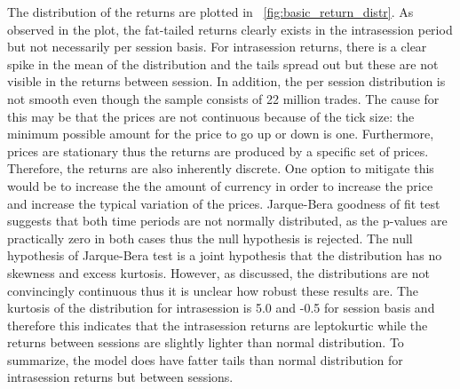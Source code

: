 The distribution of the returns are plotted in ~\ref{fig:basic_return_distr}. As observed in the plot, the fat-tailed returns
clearly exists in the intrasession period but not necessarily per session basis. For intrasession returns, there is a clear spike in the mean of the 
distribution and the tails spread out but these are not visible in the returns between session. In addition, the per session distribution
is not smooth even though the sample consists of 22 million trades. The cause for this may be that the prices are not 
continuous because of the tick size: the minimum possible amount for the price to go up or down is one. Furthermore, prices are
stationary thus the returns are produced by a specific set of prices. Therefore, the returns are also inherently discrete. One option
to mitigate this would be to increase the the amount of currency in order to increase the price and increase the typical
variation of the prices. Jarque-Bera goodness of fit test suggests that both time periods are not normally distributed,
as the p-values are practically zero in both cases thus the null hypothesis is rejected. The null hypothesis of Jarque-Bera test 
is a joint hypothesis that the distribution has no skewness and excess kurtosis. However, as discussed, the distributions are not 
convincingly continuous thus it is unclear how robust these results are. The kurtosis of the distribution for intrasession is 5.0 
and -0.5 for session basis and therefore this indicates that the intrasession returns are leptokurtic while the returns between 
sessions are slightly lighter than normal distribution. To summarize, the model does have fatter tails than normal distribution
for intrasession returns but between sessions. 


